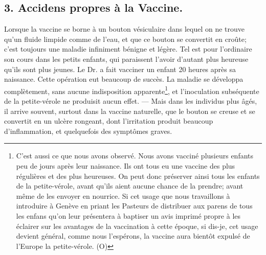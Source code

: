 \subsection{3. Accidens propres à la Vaccine.}
Lorsque la vaccine se borne à un bouton vésiculaire dans lequel on ne trouve qu'un fluide limpide comme de l'eau, et que ce bouton se convertit en croûte; c'est toujours une maladie infiniment bénigne et légère. Tel est pour l'ordinaire son cours dans les petits enfants, qui paraissent l'avoir d'autant plus heureuse qu'ils sont plus jeunes. Le Dr. a fait vacciner un enfant 20 heures après sa naissance. Cette opération eut beaucoup de succès. La maladie se développa complètement, sans aucune indisposition\setcounter{page}{276} apparente\footnote{C'est aussi ce que nous avons observé. Nous avons vacciné plusieurs enfants peu de jours après leur naissance. Ils ont tous eu une vaccine des plus régulières et des plus heureuses. On peut donc préserver ainsi tous les enfants de la petite-vérole, avant qu'ils aient aucune chance de la prendre; avant même de les envoyer en nourrice. Si cet usage que nous travaillons à introduire à Genève en priant les Pasteurs de distribuer aux parens de tous les enfans qu'on leur présentera à baptiser un avis imprimé propre à les éclairer sur les avantages de la vaccination à cette époque, si dis-je, cet usage devient général, comme nous l'espérons, la vaccine aura bientôt expulsé de l'Europe la petite-vérole. (O)}, et l'inoculation subséquente de la petite-vérole ne produisit aucun effet. — Mais dans les individus plus âgés, il arrive souvent, surtout dans la vaccine naturelle, que le bouton se creuse et se convertit en un ulcère rongeant, dont l'irritation produit beaucoup d'inflammation, et quelquefois des symptômes graves.
